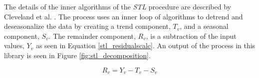 The details of the inner algorithms of the \emph{STL} procedure are described by Cleveland et al. \cite{cleveland1990stl}. The process uses an inner loop of algorithms to detrend and deseasonalize the data by creating a trend component, $T_v$, and a seasonal component, $S_v$. The remainder component, $R_v$, is a subtraction of the input values, $Y_v$ as seen in Equation \ref{stl_residualscalc}. An output of the process in this library is seen in Figure \ref{fig:stl_decomposition}. 

\begin{equation}
\label{eq:stl_residualscalc}
R_v = Y_v - T_v - S_v
\end{equation}

